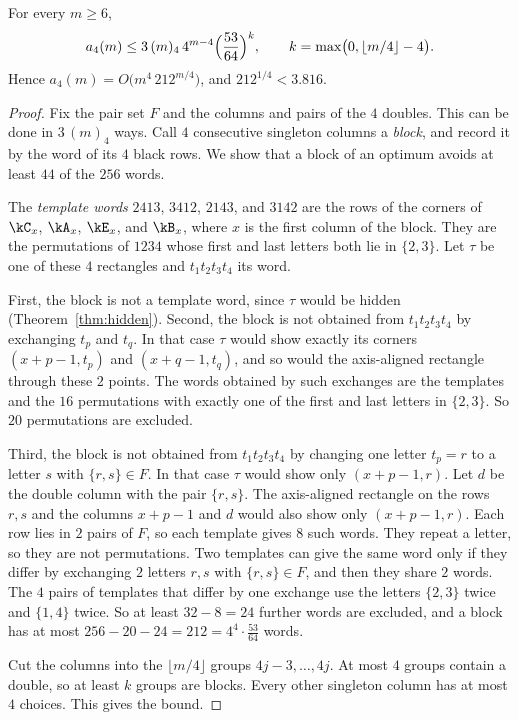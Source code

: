 
\begin{theorem}\label{thm:foursurvival}
For every $m\ge6$,
\[
a_4(m)\le3\,(m)_4\,4^{m-4}\Bigl(\frac{53}{64}\Bigr)^{k},\qquad
k=\max\bigl(0,\lfloor m/4\rfloor-4\bigr).
\]
Hence $a_4(m)=O\bigl(m^4\,212^{m/4}\bigr)$, and $212^{1/4}<3.816$.
\end{theorem}

\begin{proof}
Fix the pair set $F$ and the columns and pairs of the $4$ doubles. This can be
done in $3\,(m)_4$ ways. Call $4$ consecutive singleton columns a \emph{block},
and record it by the word of its $4$ black rows. We show that a block of an
optimum avoids at least $44$ of the $256$ words.

The \emph{template words} $2413$, $3412$, $2143$, and $3142$ are the rows of the
corners of $\kC_x$, $\kA_x$, $\kE_x$, and $\kB_x$, where $x$ is the first column
of the block. They are the permutations of $1234$ whose first and last letters
both lie in $\{2,3\}$. Let $\tau$ be one of these $4$ rectangles and
$t_1t_2t_3t_4$ its word.

First, the block is not a template word, since $\tau$ would be hidden
(Theorem~\ref{thm:hidden}). Second, the block is not obtained from
$t_1t_2t_3t_4$ by exchanging $t_p$ and $t_q$. In that case $\tau$ would show
exactly its corners $(x+p-1,t_p)$ and $(x+q-1,t_q)$, and so would the
axis-aligned rectangle through these $2$ points. The words obtained by such
exchanges are the templates and the $16$ permutations with exactly one of the
first and last letters in $\{2,3\}$. So $20$ permutations are excluded.

Third, the block is not obtained from $t_1t_2t_3t_4$ by changing one letter
$t_p=r$ to a letter $s$ with $\{r,s\}\in F$. In that case $\tau$ would show only
$(x+p-1,r)$. Let $d$ be the double column with the pair $\{r,s\}$. The
axis-aligned rectangle on the rows $r,s$ and the columns $x+p-1$ and $d$ would
also show only $(x+p-1,r)$. Each row lies in $2$ pairs of $F$, so each template
gives $8$ such words. They repeat a letter, so they are not permutations.
Two templates can give the same word only if they differ by exchanging $2$
letters $r,s$ with $\{r,s\}\in F$, and then they share $2$ words. The $4$ pairs
of templates that differ by one exchange use the letters $\{2,3\}$ twice and
$\{1,4\}$ twice. So at least $32-8=24$ further words are excluded, and a block
has at most $256-20-24=212=4^4\cdot\frac{53}{64}$ words.

Cut the columns into the $\lfloor m/4\rfloor$ groups $4j-3,\ldots,4j$. At most
$4$ groups contain a double, so at least $k$ groups are blocks. Every other
singleton column has at most $4$ choices. This gives the bound.
\end{proof}
